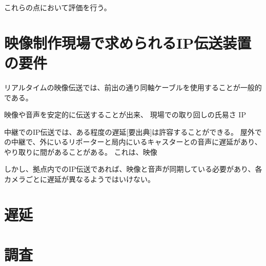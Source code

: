 これらの点において評価を行う。

\section{映像制作現場で求められるIP伝送装置の要件}

リアルタイムの映像伝送では、前出の通り同軸ケーブルを使用することが一般的である。

映像や音声を安定的に伝送することが出来、
現場での取り回しの氏易さ
IP

中継でのIP伝送では、ある程度の遅延[要出典]は許容することができる。
屋外での中継で、外にいるリポーターと局内にいるキャスターとの音声に遅延があり、やり取りに間があることがある。
これは、映像

しかし、拠点内でのIP伝送であれば、映像と音声が同期している必要があり、各カメラごとに遅延が異なるようではいけない。

\section{遅延}

\section{調査}



